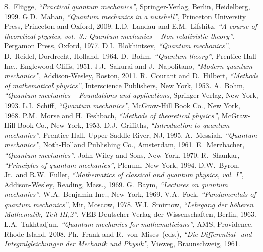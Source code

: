\documentclass[a4paper,12pt,final]{article}
\begin{document}
\begin{thebibliography}{99}
 S.~Flügge, {\it ``Practical quantum mechanics''}, Springer-Verlag, Berlin, Heidelberg, 1999.
 G.D.~Mahan, {\it ``Quantum mechanics in a nutshell''}, Princeton University Press, Princeton and Oxford, 2009.
 L.D.~Landau and E.M.~Lifshitz, {\it ``A course of theoretical physics, vol.\ 3.: Quantum mechanics -- Non-relativistic theory''}, Pergamon Press, Oxford, 1977.
 D.I.~Blokhintsev, {\it ``Quantum mechanics''}, D.~Reidel, Dordrecht, Holland, 1964.
 D.~Bohm, {\it ``Quantum theory''}, Prentice-Hall Inc., Englewood Cliffs, 1951.
 J.J.~Sakurai and J.~Napolitano, {\it ``Modern quantum mechanics''}, Addison-Wesley, Boston, 2011.
 R.~Courant and D.~Hilbert, {\it ``Methods of mathematical physics''}, Interscience Publishers, New York, 1953.
 A.~Bohm, {\it ``Quantum mechanics -- Foundations and applications}, Springer-Verlag, New York, 1993.
 L.I.~Schiff, {\it ``Quantum mechanics''}, McGraw-Hill Book Co., New York, 1968.
 P.M.~Morse and H.~Feshbach, {\it ``Methods of theoretical physics''}, McGraw-Hill Book Co., New York, 1953.
 D.J.~Griffiths, {\it ``Introduction to quantum mechanics''}, Prentice-Hall, Upper Saddle River, NJ, 1995.
 A.~Messiah, {\it ``Quantum mechanics''}, Noth-Holland Publishing Co., Amsterdam, 1961.
 E.~Merzbacher, {\it ``Quantum mechanics''}, John Wiley and Sons, New York, 1970.
 R.~Shankar, {\it ``Principles of quantum mechanics''}, Plenum, New York, 1994.
 D.W.~Byron, Jr.\ and R.W.~Fuller, {\it ``Mathematics of classical and quantum physics, vol. I''}, Addison-Wesley, Reading, Mass., 1969.
 G.~Baym, {\it``Lectures on quantum mechanics''}, W.A.~Benjamin Inc., New York, 1969.
 V.A.~Fock, {\it ``Fundamentals of quantum mechanics''}, Mir, Moscow, 1978.
 W.I.~Smirnow, {\it ``Lehrgang der höheren Mathematik, Teil III,2''}, VEB Deutscher Verlag der Wissenschaften, Berlin, 1963.
 L.A.~Takhtadjan, {\it ``Quantum mechanics for mathematicians''}, AMS, Providence, Rhode Island, 2008.
 Ph.~Frank and R.~von~Mises~(eds.), {\it ``Die Differential- und Integralgleichungen der Mechanik und Physik''}, Vieweg, Braunschweig, 1961.
\end{thebibliography}
\end{document}
